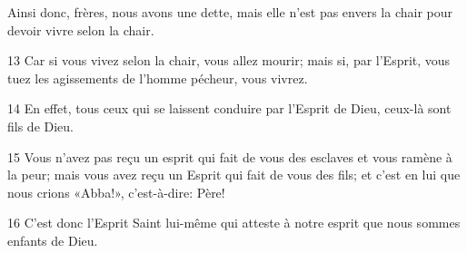 Ainsi donc, frères, nous avons une dette, mais elle n’est pas envers la chair pour devoir vivre selon la chair.

13 Car si vous vivez selon la chair, vous allez mourir; mais si, par l’Esprit, vous tuez les agissements de l’homme pécheur, vous vivrez.

14 En effet, tous ceux qui se laissent conduire par l’Esprit de Dieu, ceux-là sont fils de Dieu.

15 Vous n’avez pas reçu un esprit qui fait de vous des esclaves et vous ramène à la peur; mais vous avez reçu un Esprit qui fait de vous des fils; et c’est en lui que nous crions «Abba!», c’est-à-dire: Père!

16 C’est donc l’Esprit Saint lui-même qui atteste à notre esprit que nous sommes enfants de Dieu.
